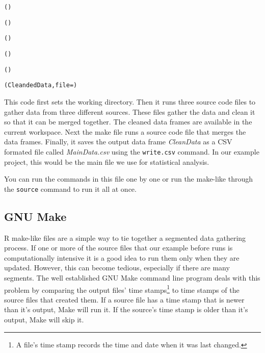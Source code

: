 \begin{knitrout}
\color{fgcolor}\begin{kframe}
\begin{alltt}
\hlcomment{################}
\hlcomment{################}

()

()

()

()
	
()

(CleandedData, file = )
\end{alltt}
\end{kframe}
\end{knitrout}


This code first sets the working directory. Then it runs three source code files to gather data from three different sources. These files gather the data and clean it so that it can be merged together. The cleaned data frames are available in the current workspace. Next the make file runs a source code file that merges the data frames. Finally, it saves the output data frame {\emph{CleanData}} as a CSV formated file called {\emph{MainData.csv}} using the {\tt{write.csv}} command. In our example project, this would be the main file we use for statistical analysis. 

You can run the commands in this file one by one or run the make-like through the \texttt{source} command to run it all at once.

\subsection{GNU Make}

R make-like files are a simple way to tie together a segmented data gathering process. If one or more of the source files that our example before runs is computationally intensive it is a good idea to run them only when they are updated. However, this can become tedious, especially if there are many segments. The well established GNU Make command line program deals with this problem by comparing the output files' time stamps\footnote{A file's time stamp records the time and date when it was last changed.} to time stamps of the source files that created them. If a source file has a time stamp that is newer than it's output, Make will run it. If the source's time stamp is older than it's output, Make will skip it.

